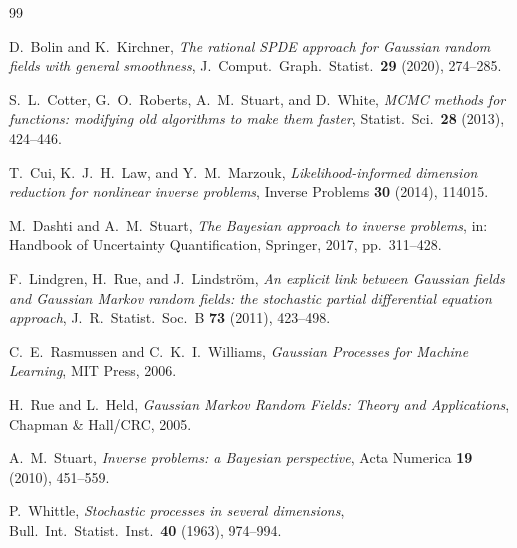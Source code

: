 \documentclass[11pt]{article}
\begin{document}
\begin{thebibliography}{99}

D.~Bolin and K.~Kirchner,
\emph{The rational SPDE approach for Gaussian random fields with general smoothness},
J.\ Comput.\ Graph.\ Statist.\ \textbf{29} (2020), 274--285.

S.~L.~Cotter, G.~O.~Roberts, A.~M.~Stuart, and D.~White,
\emph{MCMC methods for functions: modifying old algorithms to make them faster},
Statist.\ Sci.\ \textbf{28} (2013), 424--446.

T.~Cui, K.~J.~H.~Law, and Y.~M.~Marzouk,
\emph{Likelihood-informed dimension reduction for nonlinear inverse problems},
Inverse Problems \textbf{30} (2014), 114015.

M.~Dashti and A.~M.~Stuart,
\emph{The Bayesian approach to inverse problems},
in: Handbook of Uncertainty Quantification, Springer, 2017, pp.~311--428.

F.~Lindgren, H.~Rue, and J.~Lindstr\"om,
\emph{An explicit link between Gaussian fields and Gaussian Markov random fields: the stochastic partial differential equation approach},
J.\ R.\ Statist.\ Soc.\ B \textbf{73} (2011), 423--498.

C.~E.~Rasmussen and C.~K.~I.~Williams,
\emph{Gaussian Processes for Machine Learning},
MIT Press, 2006.

H.~Rue and L.~Held,
\emph{Gaussian Markov Random Fields: Theory and Applications},
Chapman \& Hall/CRC, 2005.

A.~M.~Stuart,
\emph{Inverse problems: a Bayesian perspective},
Acta Numerica \textbf{19} (2010), 451--559.

P.~Whittle,
\emph{Stochastic processes in several dimensions},
Bull.\ Int.\ Statist.\ Inst.\ \textbf{40} (1963), 974--994.

\end{thebibliography}
\end{document}
